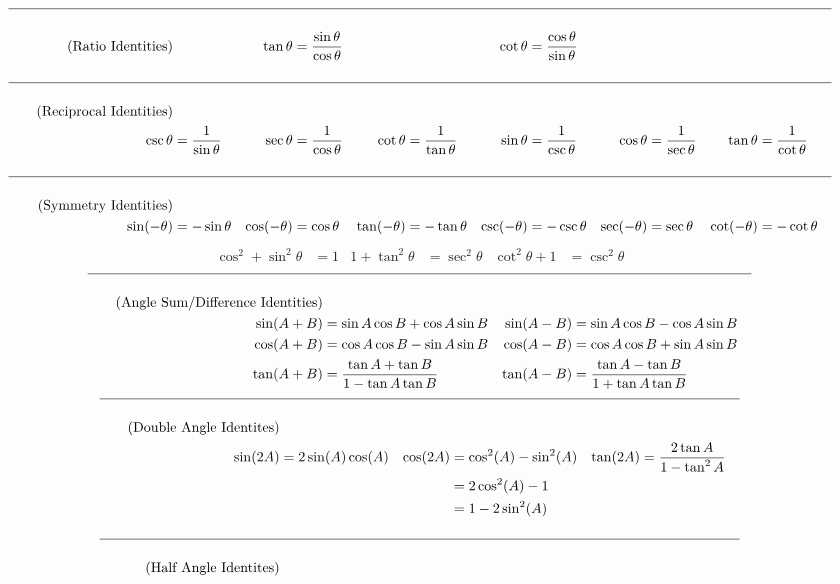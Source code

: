 \documentclass{book}
\begin{document}
\begin{appendices}
\begin{align}\hline\nonumber\\
\tag{Ratio Identities}&&\tan\theta &= \dfrac{\sin\theta}{\cos\theta}&&& \cot\theta &= \dfrac{\cos\theta}{\sin\theta}\\\nonumber\\\hline\nonumber\\
\tag{Reciprocal Identities}\\\nonumber \csc\theta &= \dfrac{1}{\sin\theta} &\sec\theta &= \dfrac{1}{\cos\theta} & \cot\theta &= \dfrac{1}{\tan\theta}& \sin\theta &=\dfrac{1}{\csc\theta}&  \cos\theta &=\dfrac{1}{\sec\theta} & \tan\theta &=\dfrac{1}{\cot\theta}\\\nonumber\\\hline\nonumber\\
\tag{Symmetry Identities}\\\nonumber \sin(-\theta) &= -\sin \theta &\cos(-\theta) &= \cos \theta&\tan(-\theta) &= -\tan \theta&\csc(-\theta) &= -\csc \theta&\sec(-\theta) &= \sec \theta&  \cot(-\theta) &= -\cot \theta
\end{align}
\pagebreak 
\begin{align}
\tag{Pythagorean Identities}  \cos^2+\sin^2\theta &= 1 &1+\tan^2\theta&=\sec^2\theta & \cot^2\theta + 1 &= \csc^2\theta
\end{align}
\begin{align}\hline\nonumber\\
\tag{Angle Sum/Difference Identities}  \\
\nonumber \sin(A+B) &= \sin A\cos B + \cos A\sin B &  \sin(A-B) &= \sin A\cos B - \cos A\sin B\\
\nonumber \cos(A+B) &= \cos A\cos B - \sin A\sin B &  \cos(A-B) &= \cos A\cos B + \sin A\sin B\\
\nonumber \tan(A+B) &= \dfrac{\tan A+\tan B}{1-\tan A\tan B} & \tan(A-B) &= \dfrac{\tan A-\tan B}{1+\tan A\tan B}
\end{align}
\begin{align}\hline\nonumber\\
\tag{Double Angle Identites}\\\nonumber \sin(2A) &= 2\sin(A)\cos(A) & \cos(2A) &= \cos^2(A) - \sin^2(A) &
 \tan(2A) &= \dfrac{2\tan A}{1-\tan^2A}\\
\nonumber &&&= 2\cos^2(A) -1\\
\nonumber &&&= 1 - 2\sin^2(A)\\\nonumber\\\hline\nonumber\\
\tag{Half Angle Identites}\\

\end{align}
\end{appendices}
\end{document}
